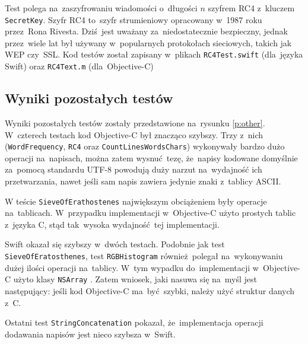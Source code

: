 \documentclass[mgr, shortabstract]{iithesis}
\newcommand{\objcinline}[1]{
    \texttt{#1}
}
\begin{document}
Test polega na~zaszyfrowaniu wiadomości o~długości $n$ szyfrem RC4 z~kluczem \texttt{SecretKey}. Szyfr RC4 to~szyfr strumieniowy opracowany w~1987 roku przez~Rona Rivesta. Dziś jest uważany za~niedostatecznie bezpieczny, jednak przez~wiele lat był używany w~popularnych protokołach sieciowych, takich jak WEP czy~SSL. Kod testów został zapisany w~plikach \texttt{RC4Test.swift} (dla~języka Swift) oraz \texttt{RC4Text.m} (dla~Objective-C)

\subsection{Wyniki pozostałych testów}

Wyniki pozostałych testów zostały przedstawione na~rysunku \ref{p:other}. W~czterech testach kod Objective-C był znacząco szybszy. Trzy z~nich (\texttt{WordFrequency}, \texttt{RC4} oraz \texttt{CountLinesWordsChars}) wykonywały bardzo dużo operacji na~napisach, można zatem wysnuć tezę, że~napisy kodowane domyślnie za~pomocą standardu UTF-8 powodują duży narzut na~wydajność ich przetwarzania, nawet jeśli sam napis zawiera jedynie znaki z~tablicy ASCII.

W teście \texttt{SieveOfErathostenes} największym obciążeniem były operacje na~tablicach. W~przypadku implementacji w~Objective-C użyto prostych tablic z~języka C, stąd tak~wysoka wydajność tej implementacji.

Swift okazał się szybszy w~dwóch testach. Podobnie jak test \texttt{SieveOfEratosthenes}, test \texttt{RGBHistogram} również polegał na~wykonywaniu dużej ilości operacji na~tablicy. W~tym wypadku do~implementacji w~Objective-C użyto klasy \objcinline{NSArray}. Zatem wniosek, jaki nasuwa się na~myśl jest następujący: jeśli kod Objective-C ma~być szybki, należy użyć struktur danych z~C.

Ostatni test \texttt{StringConcatenation} pokazał, że~implementacja operacji dodawania napisów jest nieco szybsza w~Swift.
\end{document}
